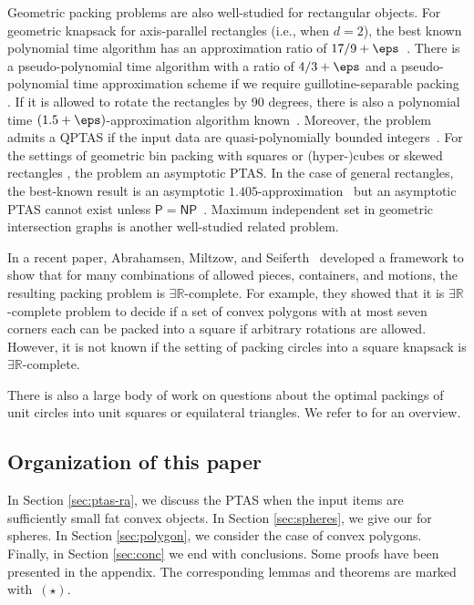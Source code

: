 Geometric packing problems are also well-studied for rectangular objects. 
For geometric knapsack for axis-parallel rectangles (i.e., when $d=2$),
the best known polynomial time algorithm has an approximation ratio of $17/9+\eps$~\cite{galvez2017approximating}. 
There is a pseudo-polynomial time algorithm with a ratio of $4/3+\eps$
\cite{galvez2021improved} and a pseudo-polynomial time approximation scheme if we require guillotine-separable packing \cite{KhanMSW21}. If it is allowed to rotate the rectangles
by 90 degrees, there is also a polynomial time $(1.5+\eps)$-approximation
algorithm known~\cite{galvez2017approximating}. Moreover, the problem
admits a \textsf{QPTAS} if the input data are quasi-polynomially bounded integers~\cite{adamaszek2014quasi}.
For the settings of geometric bin packing with squares or (hyper-)cubes \cite{bansal2006bin} or skewed rectangles \cite{KhanS23},  
the problem  an asymptotic \textsf{PTAS}. In the
case of general rectangles, the best-known result is an asymptotic $1.405$-approximation~\cite{bansal2014improved}
but an asymptotic \textsf{PTAS} cannot exist unless $\mathsf{P=NP}$~\cite{ChlebikC09}.
Maximum independent set in geometric intersection graphs \cite{ChanH12, Mitchell21, GalvezKMMPW22} is another well-studied related problem. 

In a recent paper, Abrahamsen, Miltzow, and Seiferth~\cite{abrahamsen2020framework}
developed a framework to show that for many combinations of allowed
pieces, containers, and motions, the resulting packing problem is
$\exists\mathbb{R}$-complete. For example, they showed that it is
$\exists\mathbb{R}$-complete problem to decide if a set of convex
polygons with at most seven corners each can be packed into a square
if arbitrary rotations are allowed. 
However, it is not known if the setting of packing circles into a
square knapsack is $\exists\mathbb{R}$-complete.

There is also a large body of work on questions about the optimal packings of unit circles into unit squares or equilateral triangles.
We refer to \cite{fekete2023packing, fodor2003densest, goldberg1971packing, hifi2009literature} for an overview. 


\subsection{Organization of this paper}
In Section \ref{sec:ptas-ra}, we discuss the \textsf{PTAS} when the input items are sufficiently small fat convex objects. In Section \ref{sec:spheres}, we give our  for spheres.
In Section \ref{sec:polygon}, we consider the case of convex polygons.  Finally, in Section \ref{sec:conc} we end with conclusions. 
Some proofs have been presented in the appendix. 
The corresponding lemmas and theorems are marked with~$(\star)$.


